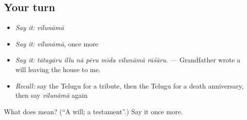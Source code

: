 \subsection*{Your turn}
\begin{itemize}
\raggedright
  \item \emph{Say it:} \emph{vīlunāmā}
  \item \emph{Say it:} \emph{vīlunāmā}, once more
  \item \emph{Say it:} \emph{tātagāru illu nā pēru mīda vīlunāmā rāśāru.} — Grandfather wrote a will leaving the house to me.
  \item \emph{Recall:} say the Telugu for a tribute, then the Telugu for a death anniversary, then say \emph{vīlunāmā} again
\end{itemize}

\begin{tcolorbox}[breakable,colback=teal!4,colframe=teal!35!black,title={Before you move on}]
What does  mean? (\textquotedblleft{}A will; a testament\textquotedblright{}.) Say it once more.
\end{tcolorbox}

